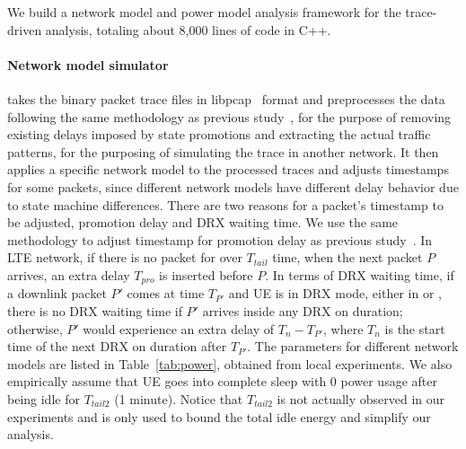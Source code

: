 \label{sec:method.sim}
We build a network model and power model analysis framework for the trace-driven analysis, totaling about 8,000 lines of code in C++.


\paragraph{Network model simulator} takes the binary packet trace files in libpcap~\cite{tcpdump} format and preprocesses the data following the same methodology as previous study~\cite{imc.3g}, for the purpose of removing existing delays imposed by state promotions and extracting the actual traffic patterns, \eg for the purposing of simulating the trace in another network. It then applies a specific network model to the processed traces and adjusts timestamps for some packets, since different network models have different delay behavior due to state machine differences. There are two reasons for a packet's timestamp to be adjusted, promotion delay and DRX waiting time.  We use the same methodology to adjust timestamp for promotion delay as previous study~\cite{imc.3g}. In LTE network, if there is no packet for over $T_{tail}$ time, when the next packet $P$ arrives, an extra delay $T_{pro}$ is inserted before $P$. In terms of DRX waiting time, if a downlink packet $P'$ comes at time $T_{P'}$ and UE is in DRX mode, either in \RC or \RI, there is no DRX waiting time if $P'$ arrives inside any DRX on duration; otherwise, $P'$ would experience an extra delay of $T_n - T_{P'}$, where $T_n$ is the start time of the next DRX on duration after $T_{P'}$. The parameters for different network models are listed in Table~\ref{tab:power}, obtained from local experiments. We also empirically assume that UE goes into complete sleep with 0 power usage after being idle for $T_{tail2}$ (1 minute). Notice that $T_{tail2}$ is not actually observed in our experiments and is only used to bound the total idle energy and simplify our analysis.

